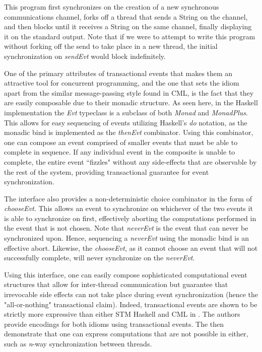 \documentclass[conference, letterpaper]{IEEEtran}
\begin{document}
This program first synchronizes on the creation of a new synchronous communications channel, forks off a thread that sends a String on the channel, and then blocks until it receives a String on the same channel, finally displaying it on the standard output. Note that if we were to attempt to write this program without forking off the send to take place in a new thread, the initial synchronization on \textit{sendEvt} would block indefinitely.

One of the primary attributes of transactional events that makes them an attractive tool for concurrent programming, and the one that sets the idiom apart from the similar message-passing style found in CML, is the fact that they are easily composable due to their monadic structure. As seen here, in the Haskell implementation the \textit{Evt} typeclass is a subclass of both \textit{Monad} and \textit{MonadPlus}. This allows for easy sequencing of events utilizing Haskell's \textit{do} notation, as the monadic bind is implemented as the \textit{thenEvt} combinator. Using this combinator, one can compose an event comprised of smaller events that must be able to complete in sequence. If any individual event in the composite is unable to complete, the entire event ``fizzles" without any side-effects that are observable by the rest of the system, providing transactional guarantee for event synchronization.

The interface also provides a non-deterministic choice combinator in the form of \textit{chooseEvt}. This allows an event to synchronize on whichever of the two events it is able to synchronize on first, effectively aborting the computations performed in the event that is not chosen. Note that \textit{neverEvt} is the event that can never be synchronized upon. Hence, sequencing a \textit{neverEvt} using the monadic bind is an effective abort. Likewise, the \textit{chooseEvt}, as it cannot choose an event that will not successfully complete, will never synchronize on the \textit{neverEvt}.

Using this interface, one can easily compose sophisticated computational event structures that allow for inter-thread communication but guarantee that irrevocable side effects can not take place during event synchronization (hence the "all-or-nothing" transactional claim). Indeed, transactional events are shown to be strictly more expressive than either STM Haskell and CML in \cite{te:original}. The authors provide encodings for both idioms using transactional events. The then demonstrate that one can express computations that are not possible in either, such as \textit{n}-way synchronization between threads.
\end{document}

